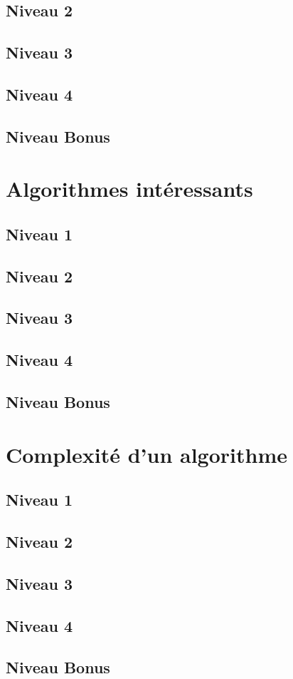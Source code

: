 \documentclass[a4paper]{report}
\begin{document}
			\subsection{Niveau 2}
		
			\subsection{Niveau 3}
			
			\subsection{Niveau 4}
			
			\subsection{Niveau Bonus}
		
		\section{Algorithmes intéressants}
		
			\subsection{Niveau 1}
		
			\subsection{Niveau 2}
		
			\subsection{Niveau 3}
			
			\subsection{Niveau 4}
			
			\subsection{Niveau Bonus}
		
		\section{Complexité d'un algorithme}
		
			\subsection{Niveau 1}
		
			\subsection{Niveau 2}
		
			\subsection{Niveau 3}
			
			\subsection{Niveau 4}
			
			\subsection{Niveau Bonus}
\end{document}
